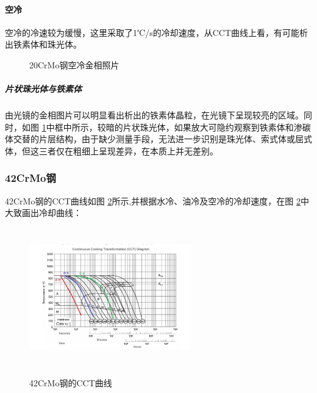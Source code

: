 \documentclass[12pt]{ctexart}
\begin{document}
\paragraph{空冷}
空冷的冷速较为缓慢，这里采取了1℃/s的冷却速度，从CCT曲线上看，有可能析出铁素体和珠光体。
\begin{figure}[ht!]
  \centering
  \caption{20CrMo钢空冷金相照片}
  \label{20air}
\end{figure}
\subparagraph{片状珠光体与铁素体}
由光镜的金相图片可以明显看出析出的铁素体晶粒，在光镜下呈现较亮的区域。同时，如图 \ref{20air}中框中所示，较暗的片状珠光体，如果放大可隐约观察到铁素体和渗碳体交替的片层结构，由于缺少测量手段，无法进一步识别是珠光体、索式体或屈式体，但这三者仅在粗细上呈现差异，在本质上并无差别。
\subsubsection{42CrMo钢}
42CrMo钢的CCT曲线如图 \ref{cct42}所示,并根据水冷、油冷及空冷的冷却速度，在图 \ref{cct42}中大致画出冷却曲线：
\begin{figure}[h]
  \centering
  \includegraphics[width=7cm,height=6cm]{cct42.jpg}\\
  \caption{42CrMo钢的CCT曲线}\label{cct42}
\end{figure}
\end{document}
